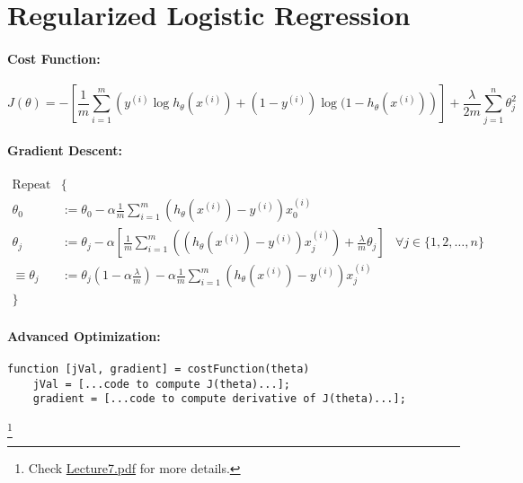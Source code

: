 \documentclass[a4paper, 12pt]{report}
\newcommand\blfootnote[1]{
	\begingroup
	\renewcommand\thefootnote{}\footnote{#1}
	\addtocounter{footnote}{-1}
	\endgroup
}
\begin{document}
\section{Regularized Logistic Regression}
\paragraph{Cost Function:}
\begin{equation*}
	J(\theta) = -\left[
		\frac{1}{m}\sum_{i=1}^m\left(
		y^{(i)}\log h_\theta(x^{(i)}) +
		(1 - y^{(i)})\log(1 - h_\theta(x^{(i)})
		\right)
		\right] + \frac{\lambda}{2m}\sum_{j=1}^n\theta_j^2
\end{equation*}

\paragraph{Gradient Descent:}
\begin{align*}
	\text{Repeat}   & \{                                                             \\
	\theta_0        & :=
	\theta_0 - \alpha \frac{1}{m} \sum_{i=1}^m(h_\theta(x^{(i)}) - y^{(i)})x_0^{(i)} \\
	\theta_j        & :=
	\theta_j - \alpha \left[
	\frac{1}{m} \sum_{i=1}^m\left(
	(h_\theta(x^{(i)}) - y^{(i)})x_j^{(i)}
	\right) + \frac{\lambda}{m}\theta_j
	\right]         & \forall j \in \{1, 2, \dots, n\}                               \\
	\equiv \theta_j & :=
	\theta_j(1 - \alpha\frac{\lambda}{m}) - \alpha\frac{1}{m}\sum_{i=1}^m(
	h_\theta(x^{(i)}) - y^{(i)}
	)x_j^{(i)}                                                                       \\
	\}
\end{align*}

\paragraph{Advanced Optimization:}
\begin{verbatim}
function [jVal, gradient] = costFunction(theta)
	jVal = [...code to compute J(theta)...];
	gradient = [...code to compute derivative of J(theta)...];
\end{verbatim}

\blfootnote{Check \href{lecture_pdf/Lecture7.pdf}{Lecture7.pdf} for more details.}

\end{document}
